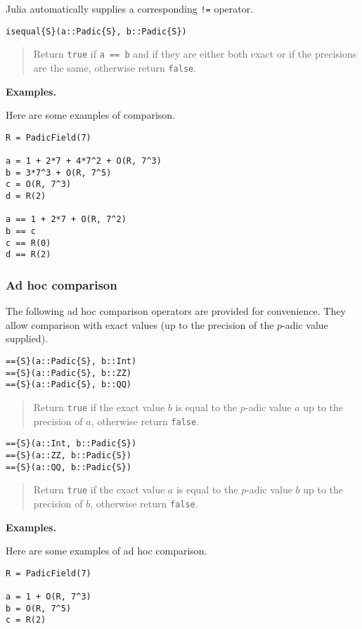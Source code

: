 \documentclass[a4paper,10pt]{article}
\newcommand{\code}{\lstinline}
\newcommand{\desc}[1]{\vspace{-3mm}\begin{quote}#1\end{quote}}
\begin{document}
{{Julia automatically supplies a corresponding \code{!=} operator.

\begin{lstlisting}
isequal{S}(a::Padic{S}, b::Padic{S})
\end{lstlisting}

\desc{Return \code{true} if \code{a == b} and if they are either both exact or
if the precisions are the same, otherwise return \code{false}.}

\textbf{Examples.}

Here are some examples of comparison.

\begin{lstlisting}
R = PadicField(7)

a = 1 + 2*7 + 4*7^2 + O(R, 7^3)
b = 3*7^3 + O(R, 7^5)
c = O(R, 7^3)
d = R(2)

a == 1 + 2*7 + O(R, 7^2)
b == c
c == R(0)
d == R(2)
\end{lstlisting}

\subsubsection{Ad hoc comparison}

The following ad hoc comparison operators are provided for convenience. They
allow comparison with exact values (up to the precision of the $p$-adic value
supplied).

\begin{lstlisting}
=={S}(a::Padic{S}, b::Int)
=={S}(a::Padic{S}, b::ZZ)
=={S}(a::Padic{S}, b::QQ)
\end{lstlisting}

\desc{Return \code{true} if the exact value $b$ is equal to the $p$-adic 
value $a$ up to the precision of $a$, otherwise return \code{false}.}

\begin{lstlisting}
=={S}(a::Int, b::Padic{S})
=={S}(a::ZZ, b::Padic{S})
=={S}(a::QQ, b::Padic{S})
\end{lstlisting}

\desc{Return \code{true} if the exact value $a$ is equal to the $p$-adic 
value $b$ up to the precision of $b$, otherwise return \code{false}.}

\textbf{Examples.}

Here are some examples of ad hoc comparison.

\begin{lstlisting}
R = PadicField(7)

a = 1 + O(R, 7^3)
b = O(R, 7^5)
c = R(2)


\end{lstlisting}}}
\end{document}
